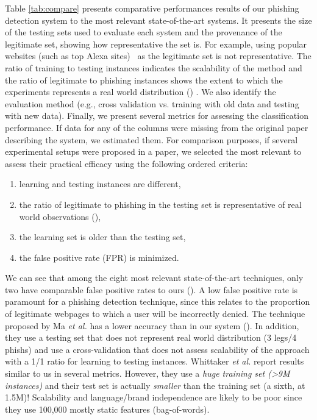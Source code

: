 \documentclass[10pt,conference,compsocconf,letterpaper]{IEEEtran}
\begin{document}
Table \ref{tab:compare} presents comparative performances results of our phishing detection system to the most relevant state-of-the-art systems. It presents the size of the testing sets used to evaluate each system and the provenance of the legitimate set, showing how representative the set is. For example, using popular websites (such as top Alexa sites)~\cite{Chen:2014:anti,ramesh:2014:efficious} as the legitimate set is not representative. The ratio of training to testing instances indicates the scalability of the method and the ratio of legitimate to phishing instances shows the extent to which the experiments represents a real world distribution () \cite{whittaker:2010:large,zhang:2007:cantina}. We also identify the evaluation method (e.g., cross validation vs. training with old data and testing with new data). Finally, we present several metrics for assessing the classification performance. If data for any of the columns were missing from the original paper describing the system, we estimated them.
For comparison purposes, if several experimental setups were proposed in a paper, we selected the most relevant to assess their practical efficacy using the following ordered criteria:

\begin{enumerate}[topsep=0pt,itemsep=-1ex,partopsep=0pt,parsep=1ex]
\item learning and testing instances are different,
 \item the ratio of legitimate to phishing in the testing set is representative of real world observations (),
 \item the learning set is older than the testing set,
 \item the false positive rate (FPR) is minimized.
\end{enumerate}

We can see that among the eight most relevant state-of-the-art techniques, only two \cite{Ma:2009:beyond,whittaker:2010:large} have comparable false positive rates to ours (). A low false positive rate is paramount for a phishing detection technique, since this relates to the proportion of legitimate webpages to which a user will be incorrectly denied.
The technique proposed by Ma \textit{et al.} \cite{Ma:2009:beyond} has a lower accuracy than in our system (). In addition, they use a testing set that does not represent real world distribution (3 legs/4 phishs) and use a cross-validation that does not assess scalability of the approach with a 1/1 ratio for learning to testing instances. 
Whittaker \textit{et al.} \cite{whittaker:2010:large} report results similar to us in several metrics. However, they use a \emph{huge training set (\textgreater 9M instances)} and their test set is actually \emph{smaller} than the training set (a sixth, at 1.5M)! Scalability and language/brand independence are likely to be poor since they use 100,000 mostly static features (bag-of-words).
\end{document}
